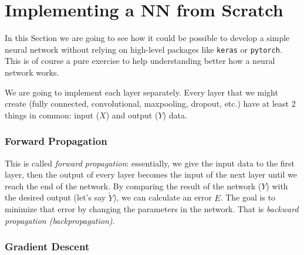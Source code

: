 \section{Implementing a NN from Scratch}

In this Section we are going to see how it could be possible to develop a simple neural network without relying on high-level packages like \texttt{keras} or \texttt{pytorch}.
This is of course a pure exercise to help understanding better how a neural network works.

%

We are going to implement each layer separately. Every layer that we might create (fully connected, convolutional, maxpooling, dropout, etc.) have at least 2 things in common: input ($X$) and output ($Y$) data.

\subsubsection{Forward Propagation}

This is called \emph{forward propagation}: essentially, we give the input data to the first layer, then the output of every layer becomes the input of the next layer until we reach the end of the network. By comparing the result of the network ($Y$) with the desired output (let’s say $\tilde{Y}$), we can calculate an error $E$. The goal is to minimize that error by changing the parameters in the network. That is \emph{backward propagation (backpropagation)}.

\subsubsection{Gradient Descent}

